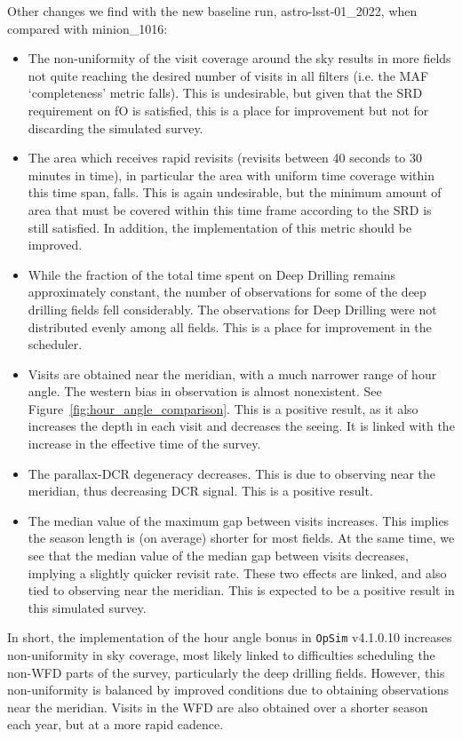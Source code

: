 \documentclass[DM,lsstdraft,authoryear,toc]{lsstdoc}
\newcommand{\opsim}{\texttt{OpSim}\xspace}
\begin{document}
Other changes we find with the new baseline run, astro-lsst-01\_2022, when compared with minion\_1016:
\begin{itemize}
\item The non-uniformity of the visit coverage around the sky results in more fields not quite reaching the desired number of visits in all filters (i.e. the MAF `completeness' metric falls). This is undesirable, but given that the SRD requirement on fO is satisfied, this is a place for improvement but not for discarding the simulated survey.
\item The area which receives rapid revisits (revisits between 40 seconds to 30 minutes in time), in particular the area with uniform time coverage within this time span, falls. This is again undesirable, but the minimum amount of area that must be covered within this time frame according to the SRD is still satisfied. In addition, the implementation of this metric should be improved.
\item While the fraction of the total time spent on Deep Drilling remains approximately constant, the number of observations for some of the deep drilling fields fell considerably. The observations for Deep Drilling were not distributed evenly among all fields. This is a place for improvement in the scheduler.
\item Visits are obtained near the meridian, with a much narrower range of hour angle. The western bias in observation is almost nonexistent. See Figure~\ref{fig:hour_angle_comparison}.  This is a positive result, as it also increases the depth in each visit and decreases the seeing. It is linked with the increase in the effective time of the survey.
\item The parallax-DCR degeneracy decreases. This is due to observing near the meridian, thus decreasing DCR signal. This is a positive result.
\item The median value of the maximum gap between visits increases. This implies the season length is (on average) shorter for most fields. At the same time, we see that the median value of the median gap between visits decreases, implying a slightly quicker revisit rate. These two effects are linked, and also tied to observing near the meridian. This is expected to be a positive result in this simulated survey.
\end{itemize}
In short, the implementation of the hour angle bonus in \opsim v4.1.0.10 increases non-uniformity in sky coverage, most likely linked to difficulties scheduling the non-WFD parts of the survey, particularly the deep drilling fields. However, this non-uniformity is balanced by improved conditions due to obtaining observations near the meridian. Visits in the WFD are also obtained over a shorter season each year, but at a more rapid cadence.
\end{document}
